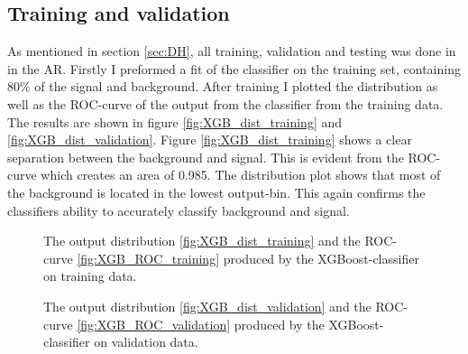 \documentclass{article}
\begin{document}
\subsection{Training and validation}\label{subsec:training}
As mentioned in section \ref{sec:DH}, all training, validation and testing was done in in the AR. Firstly I preformed a fit of the classifier on the training set, containing $80\%$ of the signal and background. After training I plotted the distribution as well as the ROC-curve of the output from the classifier from the training data. The results are shown in figure \ref{fig:XGB_dist_training} and \ref{fig:XGB_dist_validation}. Figure \ref{fig:XGB_dist_training} shows a clear separation between the background and signal.  This is evident from the ROC-curve which creates an area of 0.985. The distribution plot shows that most of the background is located in the lowest output-bin. This again confirms the classifiers ability to accurately classify background and signal.  
\begin{figure}
    \caption{The output distribution \ref{fig:XGB_dist_training} and the ROC-curve \ref{fig:XGB_ROC_training} produced by the XGBoost-classifier on training data. }
\end{figure}
\begin{figure}
    \caption{The output distribution \ref{fig:XGB_dist_validation} and the ROC-curve \ref{fig:XGB_ROC_validation} produced by the XGBoost-classifier on validation data.}
\end{figure}
\end{document}
